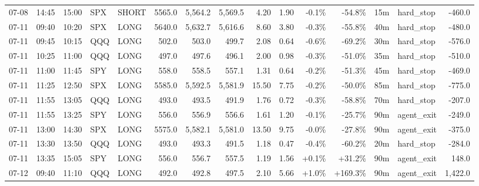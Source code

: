 \documentclass[11pt,a4paper,twoside]{article}
\begin{document}
\begin{landscape}
\begin{center}
\begin{longtable}{>{\color{txtmain}}l l l l l r r r r r r r r >{\color{txtmain}}l r}
07-08 & 14:45 & 15:00 & SPX & SHORT & 5565.0 & 5,564.2 & 5,569.5 & 4.20 & 1.90 & \textcolor{lossred}{-0.1\%} & \textcolor{lossred}{-54.8\%} & 15m & hard\_stop & \textcolor{lossred}{-460.0} \\
07-11 & 09:40 & 10:20 & SPX & LONG & 5640.0 & 5,632.7 & 5,616.6 & 8.60 & 3.80 & \textcolor{lossred}{-0.3\%} & \textcolor{lossred}{-55.8\%} & 40m & hard\_stop & \textcolor{lossred}{-480.0} \\
07-11 & 09:45 & 10:15 & QQQ & LONG & 502.0 & 503.0 & 499.7 & 2.08 & 0.64 & \textcolor{lossred}{-0.6\%} & \textcolor{lossred}{-69.2\%} & 30m & hard\_stop & \textcolor{lossred}{-576.0} \\
07-11 & 10:25 & 11:00 & QQQ & LONG & 497.0 & 497.6 & 496.1 & 2.00 & 0.98 & \textcolor{lossred}{-0.3\%} & \textcolor{lossred}{-51.0\%} & 35m & hard\_stop & \textcolor{lossred}{-510.0} \\
07-11 & 11:00 & 11:45 & SPY & LONG & 558.0 & 558.5 & 557.1 & 1.31 & 0.64 & \textcolor{lossred}{-0.2\%} & \textcolor{lossred}{-51.3\%} & 45m & hard\_stop & \textcolor{lossred}{-469.0} \\
07-11 & 11:25 & 12:50 & SPX & LONG & 5585.0 & 5,592.5 & 5,581.9 & 15.50 & 7.75 & \textcolor{lossred}{-0.2\%} & \textcolor{lossred}{-50.0\%} & 85m & hard\_stop & \textcolor{lossred}{-775.0} \\
07-11 & 11:55 & 13:05 & QQQ & LONG & 493.0 & 493.5 & 491.9 & 1.76 & 0.72 & \textcolor{lossred}{-0.3\%} & \textcolor{lossred}{-58.8\%} & 70m & hard\_stop & \textcolor{lossred}{-207.0} \\
07-11 & 11:55 & 13:25 & SPY & LONG & 556.0 & 556.9 & 556.6 & 1.61 & 1.20 & \textcolor{lossred}{-0.1\%} & \textcolor{lossred}{-25.7\%} & 90m & agent\_exit & \textcolor{lossred}{-249.0} \\
07-11 & 13:00 & 14:30 & SPX & LONG & 5575.0 & 5,582.1 & 5,581.0 & 13.50 & 9.75 & \textcolor{lossred}{-0.0\%} & \textcolor{lossred}{-27.8\%} & 90m & agent\_exit & \textcolor{lossred}{-375.0} \\
07-11 & 13:30 & 13:50 & QQQ & LONG & 493.0 & 493.3 & 491.5 & 1.18 & 0.47 & \textcolor{lossred}{-0.4\%} & \textcolor{lossred}{-60.2\%} & 20m & hard\_stop & \textcolor{lossred}{-284.0} \\
07-11 & 13:35 & 15:05 & SPY & LONG & 556.0 & 556.7 & 557.5 & 1.19 & 1.56 & \textcolor{wingreen}{+0.1\%} & \textcolor{wingreen}{+31.2\%} & 90m & agent\_exit & \textcolor{wingreen}{148.0} \\
07-12 & 09:40 & 11:10 & QQQ & LONG & 492.0 & 492.8 & 497.5 & 2.10 & 5.66 & \textcolor{wingreen}{+1.0\%} & \textcolor{wingreen}{+169.3\%} & 90m & agent\_exit & \textcolor{wingreen}{1,422.0} \\

\end{longtable}
\end{center}
\end{landscape}
\end{document}
